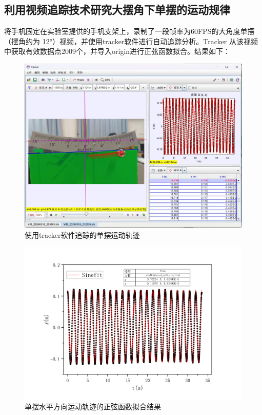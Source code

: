 \documentclass[a4paper]{extarticle}
\begin{document}
    \subsection{利用视频追踪技术研究大摆角下单摆的运动规律}
    \hspace{2em}
    将手机固定在实验室提供的手机支架上，录制了一段帧率为60FPS的大角度单摆（摆角约为 12°）视频，并使用tracker软件进行自动追踪分析。Tracker 从该视频中获取有效数据点2009个，并导入origin进行正弦函数拟合。结果如下：
    \begin{figure}[H]
        \centering
        \includegraphics[width=\linewidth]{2.jpg}
        \caption{使用tracker软件追踪的单摆运动轨迹}
    \end{figure}
    \begin{figure}[H]
        \centering
        \includegraphics[width=\linewidth]{3.png}
        \caption{单摆水平方向运动轨迹的正弦函数拟合结果}
    \end{figure}
\end{document}
